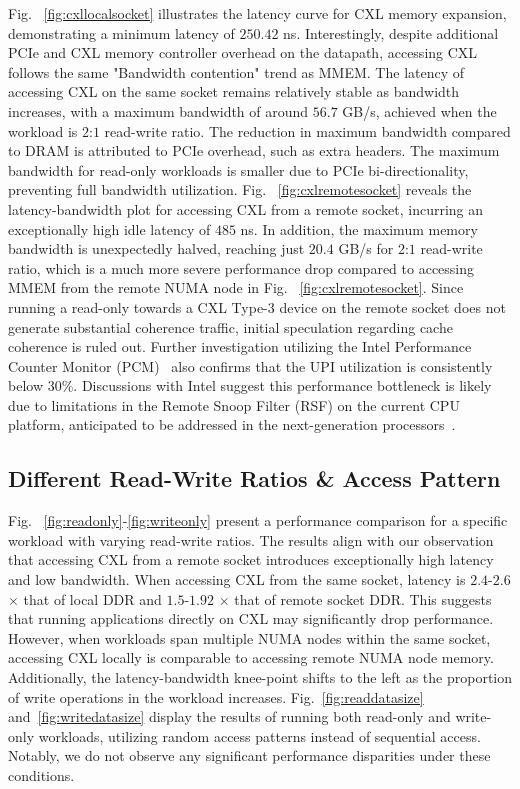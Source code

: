 Fig. ~\ref{fig:cxllocalsocket} illustrates the latency curve for CXL memory expansion, demonstrating a minimum latency of $250.42$ ns. Interestingly, despite additional PCIe and CXL memory controller overhead on the datapath, accessing CXL follows the same "Bandwidth contention" trend as MMEM. The latency of accessing CXL on the same socket remains relatively stable as bandwidth increases, with a maximum bandwidth of around $56.7$ GB/s, achieved when the workload is $2$:$1$ read-write ratio. The reduction in maximum bandwidth compared to DRAM is attributed to PCIe overhead, such as extra headers. The maximum bandwidth for read-only workloads is smaller due to PCIe bi-directionality, preventing full bandwidth utilization. Fig. ~\ref{fig:cxlremotesocket} reveals the latency-bandwidth plot for accessing CXL from a remote socket, incurring an exceptionally high idle latency of $485$ ns. In addition, the maximum memory bandwidth is unexpectedly halved, reaching just $20.4$ GB/s for $2$:$1$ read-write ratio, which is a much more severe performance drop compared to accessing MMEM from the remote NUMA node in Fig. ~\ref{fig:cxlremotesocket}. Since running a read-only towards a CXL Type-3 device on the remote socket does not generate substantial coherence traffic, initial speculation regarding cache coherence is ruled out. Further investigation utilizing the Intel Performance Counter Monitor (PCM)~\cite{pcm} also confirms that the UPI utilization is consistently below $30\%$.
Discussions with Intel suggest this performance bottleneck is likely due to limitations in the Remote Snoop Filter (RSF) on the current CPU platform, anticipated to be addressed in the next-generation processors~\cite{emerald_rapids}.



\subsection{Different Read-Write Ratios \& Access Pattern}

Fig. ~\ref{fig:readonly}-\ref{fig:writeonly} present a performance comparison for a specific workload with varying read-write ratios. The results align with our observation that accessing CXL from a remote socket introduces exceptionally high latency and low bandwidth.
When accessing CXL from the same socket, latency is $2.4$-$2.6$ $\times$ that of local DDR and $1.5$-$1.92$ $\times$ that of remote socket DDR.
This suggests that running applications directly on CXL may significantly drop performance.
However, when workloads span multiple NUMA nodes within the same socket, accessing CXL locally is comparable to accessing remote NUMA node memory.
Additionally, the latency-bandwidth knee-point shifts to the left as the proportion of write operations in the workload increases.
Fig.~\ref{fig:readdatasize} and~\ref{fig:writedatasize} display the results of running both read-only and write-only workloads, utilizing random access patterns instead of sequential access. Notably, we do not observe any significant performance disparities under these conditions.

